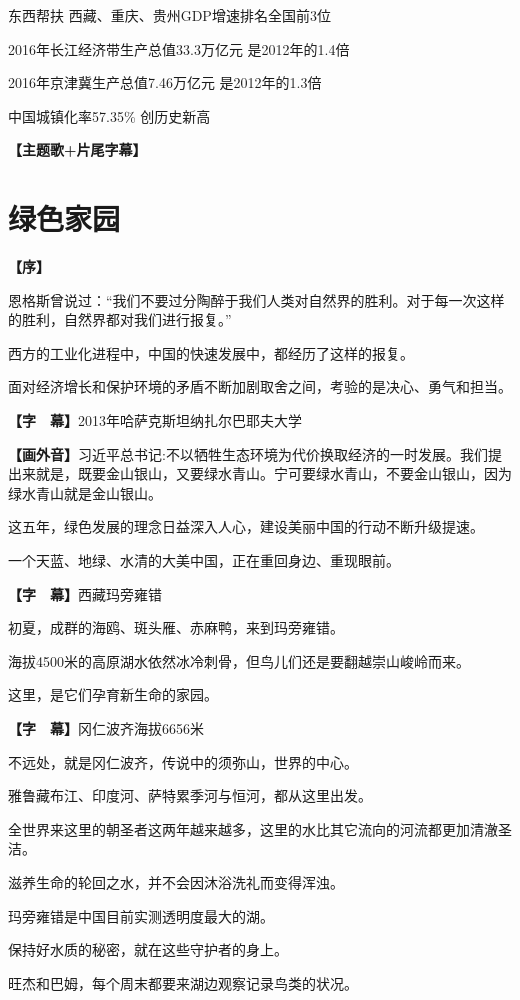 \documentclass{ctexart}
\newcommand{\zkh}[1]{\textbf{\hspace{-2.7em} 【#1】}}
\begin{document}
东西帮扶 西藏、重庆、贵州GDP增速排名全国前3位

2016年长江经济带生产总值33.3万亿元 是2012年的1.4倍

2016年京津冀生产总值7.46万亿元 是2012年的1.3倍

中国城镇化率57.35{\%} 创历史新高

\zkh{主题歌+片尾字幕}

\newpage\part{绿色家园}

\zkh{序}
 
恩格斯曾说过：``我们不要过分陶醉于我们人类对自然界的胜利。对于每一次这样的胜利，自然界都对我们进行报复。''

 西方的工业化进程中，中国的快速发展中，都经历了这样的报复。

 面对经济增长和保护环境的矛盾不断加剧取舍之间，考验的是决心、勇气和担当。

 \zkh{字　幕}2013年哈萨克斯坦纳扎尔巴耶夫大学

 \zkh{画外音}习近平总书记:不以牺牲生态环境为代价换取经济的一时发展。我们提出来就是，既要金山银山，又要绿水青山。宁可要绿水青山，不要金山银山，因为绿水青山就是金山银山。

 
这五年，绿色发展的理念日益深入人心，建设美丽中国的行动不断升级提速。

 一个天蓝、地绿、水清的大美中国，正在重回身边、重现眼前。

\zkh{字　幕}西藏玛旁雍错

 初夏，成群的海鸥、斑头雁、赤麻鸭，来到玛旁雍错。

 海拔4500米的高原湖水依然冰冷刺骨，但鸟儿们还是要翻越崇山峻岭而来。

 这里，是它们孕育新生命的家园。

 \zkh{字　幕}冈仁波齐\quad 海拔6656米

 不远处，就是冈仁波齐，传说中的须弥山，世界的中心。

 雅鲁藏布江、印度河、萨特累季河与恒河，都从这里出发。

全世界来这里的朝圣者这两年越来越多，这里的水比其它流向的河流都更加清澈圣洁。

 滋养生命的轮回之水，并不会因沐浴洗礼而变得浑浊。

 玛旁雍错是中国目前实测透明度最大的湖。

 保持好水质的秘密，就在这些守护者的身上。

 旺杰和巴姆，每个周末都要来湖边观察记录鸟类的状况。
 
\end{document}
